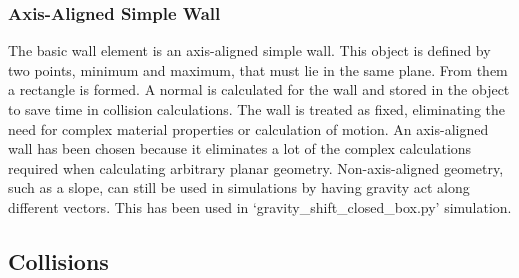\documentclass[10pt,a4paper,titlepage]{report}
\begin{document}
\subsubsection{Axis-Aligned Simple Wall}
The basic wall element is an axis-aligned simple wall. This object is defined by two points, minimum and maximum, that must lie in the same plane. From them a rectangle is formed. A normal is calculated for the wall and stored in the object to save time in collision calculations. The wall is treated as fixed, eliminating the need for complex material properties or calculation of motion. An axis-aligned wall has been chosen because it eliminates a lot of the complex calculations required when calculating arbitrary planar geometry. Non-axis-aligned geometry, such as a slope, can still be used in simulations by having gravity act along different vectors. This has been used in `gravity\_shift\_closed\_box.py' simulation.
\subsection{Collisions}
\end{document}
